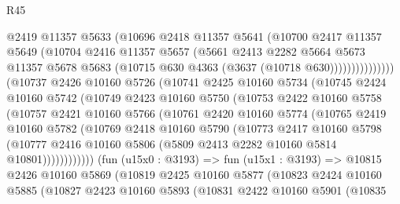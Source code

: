 \begin{lexlean}{R45}
\begin{coremodule}
                        @2419
                        @11357
                        @5633
                        (@10696
                          @2418
                          @11357
                          @5641
                          (@10700
                            @2417
                            @11357
                            @5649
                            (@10704
                              @2416
                              @11357
                              @5657
                              (@5661
                                @2413
                                @2282
                                @5664
                                @5673
                                @11357
                                @5678
                                @5683
                                (@10715 @630 @4363 (@3637 (@10718 @630)))))))))))))))
        (@10737
          @2426
          @10160
          @5726
          (@10741
            @2425
            @10160
            @5734
            (@10745
              @2424
              @10160
              @5742
              (@10749
                @2423
                @10160
                @5750
                (@10753
                  @2422
                  @10160
                  @5758
                  (@10757
                    @2421
                    @10160
                    @5766
                    (@10761
                      @2420
                      @10160
                      @5774
                      (@10765
                        @2419
                        @10160
                        @5782
                        (@10769
                          @2418
                          @10160
                          @5790
                          (@10773
                            @2417
                            @10160
                            @5798
                            (@10777
                              @2416
                              @10160
                              @5806
                              (@5809 @2413 @2282 @10160 @5814 @10801))))))))))))
        (fun (u15x0 : @3193) =>
        fun (u15x1 : @3193) =>
        @10815
          @2426
          @10160
          @5869
          (@10819
            @2425
            @10160
            @5877
            (@10823
              @2424
              @10160
              @5885
              (@10827
                @2423
                @10160
                @5893
                (@10831
                  @2422
                  @10160
                  @5901
                  (@10835

\end{coremodule}
\end{lexlean}
